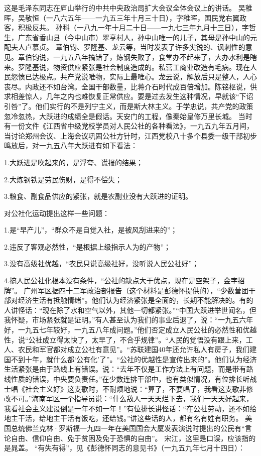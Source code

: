 \begin{maonote}
这是毛泽东同志在庐山举行的中共中央政治局扩大会议全体会议上的讲话。
吴稚晖，吴敬恒（一八六五年——一九五三年十月三十日），字稚晖，国民党右翼政客，积极反共。
孙科（一八九一年十月二十日——一九七三年九月十三日），字哲生，广东省香山县（今中山市）翠亨村人，孙中山唯一的儿子，其母是孙中山的元配夫人卢慕贞。
章伯钧、罗隆基、龙云等，当时发表了许多尖锐的、讽刺性的意见。章伯钧说，一九五八年搞错了，炼钢失败了，食堂办不起来了，大办水利是瞎来。罗隆基说，物资供应紧张是社会制度造成的。私营工商业改造有毛病。现在人民怨愤已达极点。共产党说唯物，实际上最唯心。龙云说，解放后只是整人，人心丧尽。内政还不如台湾。全国干部数量，比蒋介石时代成百倍增加。陈铭枢说，供求相差惊人，几年之内也难恢复正常供应。要是过去发生这种情况，早就该“下诏引咎”了。他们实行的不是列宁主义，而是斯大林主义。于学忠说，共产党的政策忽冷忽热，大跃进的成绩全是假话。天安门的工程，像秦始皇修万里长城。
当时有一份文件《江西省中级党校学员对人民公社的各种看法》，一九五九年五月间，当讨论郑州会议、上海会议巩固公社方针时，江西党校八十多个县委一级干部初步鸣放后，对一九五八年大跃进有如下看法：

1.大跃进是吹起来的，是浮夸、谎报的结果；

2.大炼钢铁是劳民伤财，是得不偿失；

3.粮食、副食品供应的紧张，就是农副业没有大跃进的证明。

对公社化运动提出这样一些问题：

1.是“早产儿”，“群众不是自觉入社，是被风刮进来的”；

2.违反了客观必然性，“是根据上级指示人为的产物”；

3.没有高级社优越，“农民只说高级社好，没听说人民公社好”；

4.搞人民公社化根本没有条件，“公社的缺点大于优点，现在是空架子，金字招牌”。
广州军区据四十二军政治部报告（这个材料是彭德怀提供的），“少数营团干部对经济生活有抵触情绪”。他们认为经济紧张是全面的，长期不能解决的。有的人讲怪话：“现在除了水和空气以外，其他一切都紧张。”“中国大跃进举世闻名，但我怀疑，市场紧张就是证明。”有人甚至认为我们的事业后退了，说：“一九五六年好，一九五七年较好，一九五八年成问题。”他们否定成立人民公社的必然性和优越性，说“公社成立得太快了，太早了，不合乎规律”。“人民的觉悟没有跟上来，工人、农民和军官都对成立公社有意见”。“苏联建国40年还允许私人有房子，我们建国不到十年，就什么都‘公有化’了”。“公社的优越性是宣传出来的”。他们认为经济生活紧张是由于路线上有错误。说：“去年不仅是工作方法上有问题，而是带有路线性质的错误，中央要负责任。”在少数连排干部中，也有类似情况，有位排长听战士唱《社会主义好》这支歌时，不耐烦地说：“算了，不要唱了，我看这支歌非修改不可。”海南军区一个指导员说：“什么敌人一天天烂下去，我们一天天好起来，我看社会主义建设倒是一年不如一年！”有位排长讲怪话：“在公社劳动，还不如给地主干活，给地主干活有饭吃，还给钱。”讲这些话的人，都有名有姓有职务。
美国总统佛兰克林·罗斯福一九四一年在美国国会大厦发表演说时提出的公民有“言论自由、信仰自由、免于贫困及免于恐惧的自由”。
宋江，这里是口误，应该指的是晁盖。
“有失有得”，见《彭德怀同志的意见书》（一九五九年七月十四日）：


\end{maonote}
